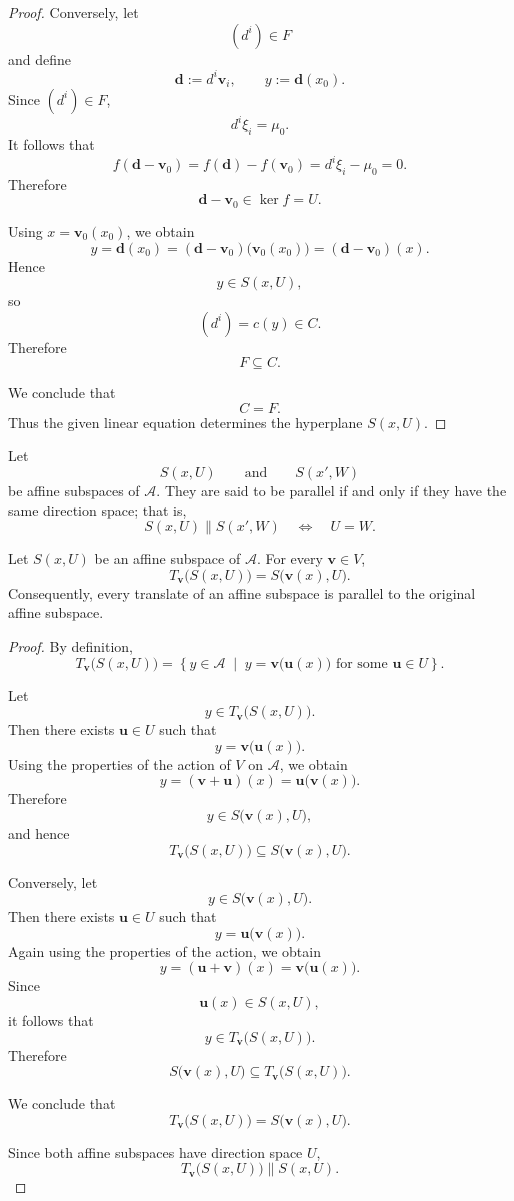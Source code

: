 \documentclass[12pt]{article}
\begin{document}
\begin{proof}
Conversely, let
\[
(d^i)\in F
\]
and define
\[
\mathbf d:=d^i\mathbf v_i,
\qquad
y:=\mathbf d(x_0).
\]
Since $(d^i)\in F$,
\[
d^i\xi_i=\mu_0.
\]
It follows that
\[
f(\mathbf d-\mathbf v_0)
 =f(\mathbf d)-f(\mathbf v_0)
 =d^i\xi_i-\mu_0
 =0.
\]
Therefore
\[
\mathbf d-\mathbf v_0\in\ker f=U.
\]

Using $x=\mathbf v_0(x_0)$, we obtain
\[
y
 =\mathbf d(x_0)
 =(\mathbf d-\mathbf v_0)\bigl(\mathbf v_0(x_0)\bigr)
 =(\mathbf d-\mathbf v_0)(x).
\]
Hence
\[
y\in S(x,U),
\]
so
\[
(d^i)=c(y)\in C.
\]
Therefore
\[
F\subseteq C.
\]

We conclude that
\[
C=F.
\]
Thus the given linear equation determines the hyperplane $S(x,U)$.
\end{proof}

\begin{definition}
Let
\[
S(x,U)
\qquad\text{and}\qquad
S(x',W)
\]
be affine subspaces of \(\mathcal A\). They are said to be parallel if and only if
they have the same direction space; that is,
\[
S(x,U)\parallel S(x',W)
\quad\Longleftrightarrow\quad
U=W.
\]
\end{definition}

\begin{proposition}
Let \(S(x,U)\) be an affine subspace of \(\mathcal A\). For every
\(\mathbf v\in V\),
\[
T_{\mathbf v}\bigl(S(x,U)\bigr)
=
S\bigl(\mathbf v(x),U\bigr).
\]
Consequently, every translate of an affine subspace is parallel to the
original affine subspace.
\end{proposition}

\begin{proof}
By definition,
\[
T_{\mathbf v}\bigl(S(x,U)\bigr)
=
\left\{
y\in \mathcal A
\;\middle|\;
y=\mathbf v\bigl(\mathbf u(x)\bigr)
\text{ for some }\mathbf u\in U
\right\}.
\]

Let
\[
y\in T_{\mathbf v}\bigl(S(x,U)\bigr).
\]
Then there exists \(\mathbf u\in U\) such that
\[
y=\mathbf v\bigl(\mathbf u(x)\bigr).
\]
Using the properties of the action of \(V\) on \(\mathcal A\), we obtain
\[
y
=
(\mathbf v+\mathbf u)(x)
=
\mathbf u\bigl(\mathbf v(x)\bigr).
\]
Therefore
\[
y\in S\bigl(\mathbf v(x),U\bigr),
\]
and hence
\[
T_{\mathbf v}\bigl(S(x,U)\bigr)
\subseteq
S\bigl(\mathbf v(x),U\bigr).
\]

Conversely, let
\[
y\in S\bigl(\mathbf v(x),U\bigr).
\]
Then there exists \(\mathbf u\in U\) such that
\[
y=\mathbf u\bigl(\mathbf v(x)\bigr).
\]
Again using the properties of the action, we obtain
\[
y
=
(\mathbf u+\mathbf v)(x)
=
\mathbf v\bigl(\mathbf u(x)\bigr).
\]
Since
\[
\mathbf u(x)\in S(x,U),
\]
it follows that
\[
y\in T_{\mathbf v}\bigl(S(x,U)\bigr).
\]
Therefore
\[
S\bigl(\mathbf v(x),U\bigr)
\subseteq
T_{\mathbf v}\bigl(S(x,U)\bigr).
\]

We conclude that
\[
T_{\mathbf v}\bigl(S(x,U)\bigr)
=
S\bigl(\mathbf v(x),U\bigr).
\]

Since both affine subspaces have direction space \(U\),
\[
T_{\mathbf v}\bigl(S(x,U)\bigr)
\parallel
S(x,U).
\]
\end{proof}
\end{document}
